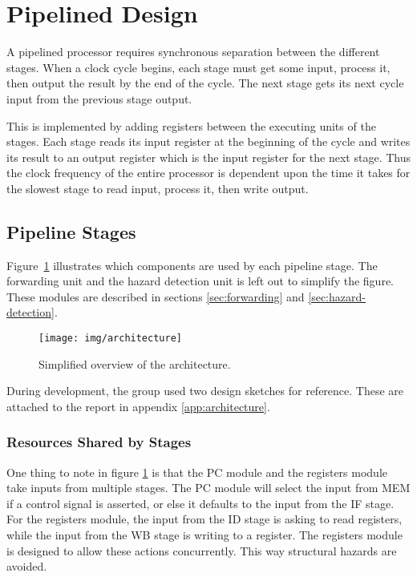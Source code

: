 \section{Pipelined Design}
A pipelined processor requires synchronous separation between the different stages.
When a clock cycle begins,
each stage must get some input, process it, then output the result by the end of the cycle.
The next stage gets its next cycle input from the previous stage output.

This is implemented by adding registers between the executing units of the stages.
Each stage reads its input register at the beginning of the cycle and writes its result to an output register which is the input register for the next stage.
Thus the clock frequency of the entire processor is dependent upon the time it takes for the slowest stage to read input, process it, then write output.

\subsection{Pipeline Stages}
Figure~\ref{fig:architecture} illustrates which components are used by each pipeline stage.
The forwarding unit and the hazard detection unit is left out to simplify the figure.
These modules are described in sections \ref{sec:forwarding} and \ref{sec:hazard-detection}.

\begin{figure}[h]
    \centering
    \texttt{[image: img/architecture]}
    \caption{
      Simplified overview of the architecture.
    }
    \label{fig:architecture}
\end{figure}

\noindent
During development, the group used two design sketches for reference.
These are attached to the report in appendix \ref{app:architecture}.

\subsubsection{Resources Shared by Stages}
One thing to note in figure \ref{fig:architecture} is that the PC module and the registers module take inputs from multiple stages.
The PC module will select the input from MEM if a control signal is asserted,
or else it defaults to the input from the IF stage.
For the registers module,
the input from the ID stage is asking to read registers, while the input from the WB stage is writing to a register.
The registers module is designed to allow these actions concurrently.
This way structural hazards are avoided.

